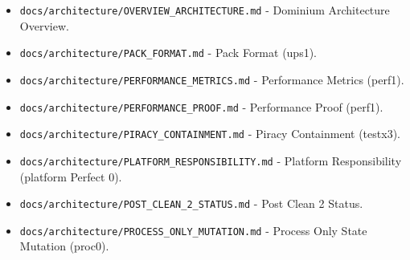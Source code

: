 \documentclass[9pt,a4paper,openany]{book}
\begin{document}
\begin{itemize}
\item \texttt{docs/\allowbreak{}architecture/\allowbreak{}OVERVIEW\_\allowbreak{}ARCHITECTURE.\allowbreak{}md} -\allowbreak{} Dominium Architecture Overview.\allowbreak{}
\end{itemize}

\begin{itemize}
\item \texttt{docs/\allowbreak{}architecture/\allowbreak{}PACK\_\allowbreak{}FORMAT.\allowbreak{}md} -\allowbreak{} Pack Format (ups1).\allowbreak{}
\end{itemize}

\begin{itemize}
\item \texttt{docs/\allowbreak{}architecture/\allowbreak{}PERFORMANCE\_\allowbreak{}METRICS.\allowbreak{}md} -\allowbreak{} Performance Metrics (perf1).\allowbreak{}
\end{itemize}

\begin{itemize}
\item \texttt{docs/\allowbreak{}architecture/\allowbreak{}PERFORMANCE\_\allowbreak{}PROOF.\allowbreak{}md} -\allowbreak{} Performance Proof (perf1).\allowbreak{}
\end{itemize}

\begin{itemize}
\item \texttt{docs/\allowbreak{}architecture/\allowbreak{}PIRACY\_\allowbreak{}CONTAINMENT.\allowbreak{}md} -\allowbreak{} Piracy Containment (testx3).\allowbreak{}
\end{itemize}

\begin{itemize}
\item \texttt{docs/\allowbreak{}architecture/\allowbreak{}PLATFORM\_\allowbreak{}RESPONSIBILITY.\allowbreak{}md} -\allowbreak{} Platform Responsibility (platform Perfect 0).\allowbreak{}
\end{itemize}

\begin{itemize}
\item \texttt{docs/\allowbreak{}architecture/\allowbreak{}POST\_\allowbreak{}CLEAN\_\allowbreak{}2\_\allowbreak{}STATUS.\allowbreak{}md} -\allowbreak{} Post Clean 2 Status.\allowbreak{}
\end{itemize}

\begin{itemize}
\item \texttt{docs/\allowbreak{}architecture/\allowbreak{}PROCESS\_\allowbreak{}ONLY\_\allowbreak{}MUTATION.\allowbreak{}md} -\allowbreak{} Process Only State Mutation (proc0).\allowbreak{}
\end{itemize}
\end{document}
